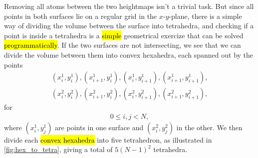 Removing all atoms between the two heightmaps isn't a trivial task. But since all points in both surfaces lie on a regular grid in the $x$-$y$-plane, there is a simple way of dividing the volume between the surface into tetrahedra, and checking if a point is inside a tetrahedra is a \hl{simple} geometrical exercize that can be solved \hl{programmatically}. If the two surfaces are not intersecting, we see that we can divide the volume between them into convex hexahedra, each spanned out by the points
\begin{align*}
    (x^1_{i}, y^1_{i}), (x^1_{i+1}, y^1_{i}), (x^1_{i}, y^1_{i+1}), (x^1_{i+1}, y^1_{i+1}), \\
    (x^2_{i}, y^2_{i}), (x^2_{i+1}, y^2_{i}), (x^2_{i}, y^2_{i+1}), (x^2_{i+1}, y^2_{i+1}),
\end{align*}
for
\begin{align*}
    0 \leq i,j < N,
\end{align*}
where $(x^1_i,y^1_j)$ are points in one surface and $(x^2_i,y^2_j)$ in the other. We then divide each \hl{convex hexahedra} into five tetrahedron, as illustrated in \cref{fig:hex_to_tetra}, giving a total of $5(N-1)^2$ tetrahedra.


% 

